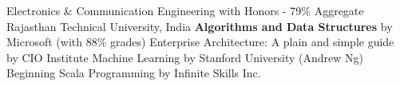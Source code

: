 

\begin{scholarship}
					{Electronics \& Communication Engineering with Honors - 79\% Aggregate \newline Rajasthan Technical University, India}
	\scholarshipentry{\faPlus}
					{\textbf{Algorithms and Data Structures} by Microsoft (with 88\% grades)}
	\scholarshipentry{\faPlus}
					{Enterprise Architecture: A plain and simple guide by CIO}
	\scholarshipentry{\faPlus}
					{Institute Machine Learning by Stanford University (Andrew Ng)}
	\scholarshipentry{\faPlus}
					{Beginning Scala Programming by Infinite Skills Inc.}
\end{scholarship}